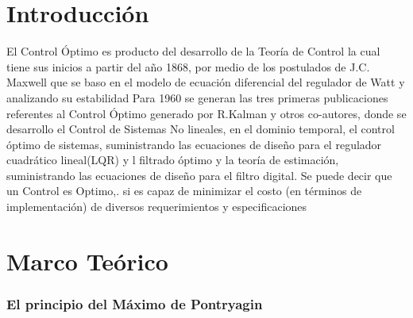 \documentclass[12pt,letterpaper]{article}
\begin{document}
\section{Introducción}
El Control Óptimo es producto del desarrollo de la Teoría de Control la cual tiene sus inicios a partir del año 1868, por medio de los postulados de J.C. Maxwell  que se baso en el modelo de ecuación
diferencial del regulador de Watt y analizando su estabilidad \cite{Teoría}
Para 1960 se generan las tres primeras publicaciones referentes al Control Óptimo generado por R.Kalman y otros co-autores, donde se desarrollo el Control de Sistemas No lineales, en el dominio temporal, el control óptimo de sistemas, suministrando
las ecuaciones de diseño para el regulador cuadrático
lineal(LQR) y l filtrado óptimo y la teoría
de estimación, suministrando las ecuaciones de diseño para
el filtro digital.\cite{Teoría}
Se puede decir que un  Control es Optimo,. si es capaz de minimizar el costo (en términos de implementación) de diversos requerimientos y especificaciones \cite{Catedra}

\section{Marco Teórico}

\subsubsection{El principio del Máximo de Pontryagin}
\end{document}
